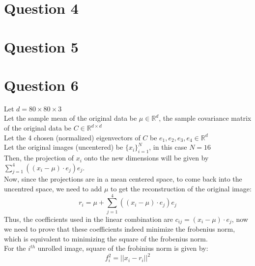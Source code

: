 \documentclass[11pt, fleqn]{article}
\begin{document}
\newpage
\section*{Question 4}
\setcounter{equation}{0}
\setcounter{figure}{0}

\newpage
\section*{Question 5}
\setcounter{equation}{0}
\setcounter{figure}{0}

\newpage
\section*{Question 6}
\setcounter{equation}{0}
\setcounter{figure}{0}
Let $d = 80\times80\times3$\\
Let the sample mean of the original data be $\mu \in \mathbb{R}^d$, the sample covariance matrix of the original data be $C \in \mathbb{R}^{d\times d}$\\
Let the 4 chosen (normalized) eigenvectors of $C$ be $e_1, e_2, e_3, e_4 \in \mathbb{R}^d$\\ 
Let the original images (uncentered) be $\{x_i\}_{i=1}^N$, in this case $N = 16$\\
Then, the projection of $x_i$ onto the new dimensions will be given by $\sum_{j=1}^{4}((x_i - \mu)\cdot e_j)e_j$.\\
Now, since the projections are in a mean centered space, to come back into the uncentred space, we need to add $\mu$ to get the reconstruction of the original image:
$$
    \boxed{r_i = \mu + \sum_{j=1}^{4}((x_i - \mu)\cdot e_j)e_j}
$$
Thus, the coefficients used in the linear combination are $\boxed{c_{ij} = (x_i - \mu)\cdot e_j}$, now we need to prove that these coefficients indeed minimize the frobenius norm, which is equivalent to minimizing the square of the frobenius norm.\\

For the $i^{th}$ unrolled image, square of the frobinius norm is given by:
$$ 
    f_i^2 = ||x_i - r_i||^2 
$$
\end{document}
